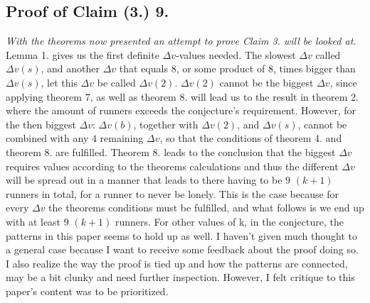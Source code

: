\documentclass[12pt, a4paper]{article}
\begin{document}
\subsection*{Proof of Claim (3.) 9.}\textit{With the theorems now presented an attempt to prove Claim 3. will be looked at.}
\newline
\newline
Lemma 1. gives us the first definite $\Delta v$-values needed. The slowest $\Delta v$ called $\Delta v(s)$, and another $\Delta v$ that equals $8$, or some product of $8$, times bigger than $\Delta v(s)$, let this $\Delta v$ be called $\Delta v(2)$. \newline $\Delta v(2)$ cannot be the biggest $\Delta v$, since applying theorem 7, as well as theorem 8. will lead us to the result in theorem 2. where the amount of runners exceeds the conjecture's requirement. However, for the then biggest $\Delta v$: $\Delta v(b)$, together with $\Delta v(2)$, and $\Delta v(s)$, cannot be combined with any $4$ remaining  $\Delta v$, so that the conditions of theorem 4. and theorem 8. are fulfilled.
\newline
\newline
Theorem 8. leads to the conclusion that the biggest $\Delta v$ requires values according to the theorems calculations and thus the different $\Delta v$ will be spread out in a manner that leads to there having to be $9$ $(k+1)$ runners in total, for a runner to never be lonely. This is the case because for every $\Delta v$ the theorems conditions must be fulfilled, and what follows is we end up with at least $9$ $(k+1)$ runners.
\newline
\newline
For other values of k, in the conjecture, the patterns in this paper seems to hold up as well. I haven't given much thought to a general case because I want to receive some feedback about the proof doing so. I also realize the way the proof is tied up and how the patterns are connected, may be a bit clunky and need further inspection. However, I felt critique to this paper's content was to be prioritized. 
\end{document}
